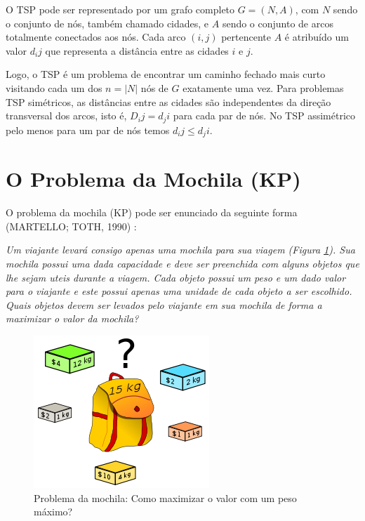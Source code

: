 O TSP pode ser representado por um grafo completo $G = (N, A)$, com $N$ sendo o conjunto de nós, também chamado cidades, e $A$ sendo o conjunto de arcos totalmente conectados aos nós. Cada arco $(i, j)$ pertencente $A$ é atribuído um valor $d_ij$ que representa a distância entre as cidades $i$ e $j$.

Logo, o TSP é um problema de encontrar um caminho fechado mais curto visitando cada um dos $n = |N|$ nós de $G$ exatamente uma vez. Para problemas TSP simétricos, as distâncias entre as cidades são independentes da direção transversal dos arcos, isto é, $D_ij = d_ji$ para cada par de nós. No TSP assimétrico pelo menos para um par de nós temos $d_ij \leq d_ji$.

\section{O Problema da Mochila (KP)}
\label{sec-kp}

O problema da mochila (KP) pode ser enunciado da seguinte forma (MARTELLO; TOTH, 1990) \cite{Martello:1990:KPA:98124}:

\textit{Um viajante levará consigo apenas uma mochila para sua viagem (Figura \ref{fig:kp-sample}). Sua mochila possui uma dada capacidade e deve ser preenchida com alguns objetos que lhe sejam uteis durante a viagem. Cada objeto possui um peso e um dado valor para o viajante e este possui apenas uma unidade de cada objeto a ser escolhido. Quais objetos devem ser levados pelo viajante em sua mochila de forma a maximizar o valor da mochila?}

\begin{figure}[h]
	\caption{\label{fig:kp-sample}Problema da mochila: Como maximizar o valor com um peso máximo?}
	\begin{center}
	    \includegraphics[scale=0.5]{imagens/kp-sample.png}
	\end{center}
\end{figure}


